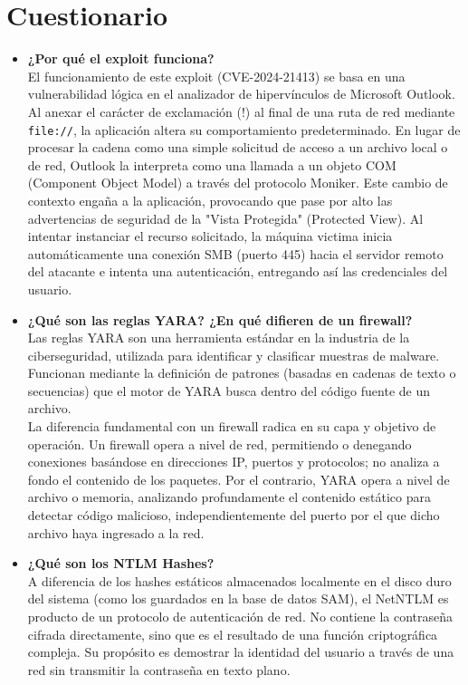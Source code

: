 \section{Cuestionario}
\begin{itemize}
	\item \textbf{¿Por qué el exploit funciona?} \\
	El funcionamiento de este exploit (CVE-2024-21413) se basa en una vulnerabilidad lógica en el analizador de hipervínculos de Microsoft Outlook. Al anexar el carácter de exclamación (!) al final de una ruta de red mediante \texttt{file://}, la aplicación altera su comportamiento predeterminado. En lugar de procesar la cadena como una simple solicitud de acceso a un archivo local o de red, Outlook la interpreta como una llamada a un objeto COM (Component Object Model) a través del protocolo Moniker. Este cambio de contexto engaña a la aplicación, provocando que pase por alto las advertencias de seguridad de la "Vista Protegida" (Protected View). Al intentar instanciar el recurso solicitado, la máquina victima inicia automáticamente una conexión SMB (puerto 445) hacia el servidor remoto del atacante e intenta una autenticación, entregando así las credenciales del usuario.
	
	\item \textbf{¿Qué son las reglas YARA? ¿En qué difieren de un firewall?} \\
	Las reglas YARA son una herramienta estándar en la industria de la ciberseguridad, utilizada para identificar y clasificar muestras de malware. Funcionan mediante la definición de patrones (basadas en cadenas de texto o secuencias) que el motor de YARA busca dentro del código fuente de un archivo. \\
	La diferencia fundamental con un firewall radica en su capa y objetivo de operación. Un firewall opera a nivel de red, permitiendo o denegando conexiones basándose en direcciones IP, puertos y protocolos; no analiza a fondo el contenido de los paquetes. Por el contrario, YARA opera a nivel de archivo o memoria, analizando profundamente el contenido estático para detectar código malicioso, independientemente del puerto por el que dicho archivo haya ingresado a la red.
	
	\item \textbf{¿Qué son los NTLM Hashes?}\\
	A diferencia de los hashes estáticos almacenados localmente en el disco duro del sistema (como los guardados en la base de datos SAM), el NetNTLM es producto de un protocolo de autenticación de red. No contiene la contraseña cifrada directamente, sino que es el resultado de una función criptográfica compleja. Su propósito es demostrar la identidad del usuario a través de una red sin transmitir la contraseña en texto plano.
	

\end{itemize}
